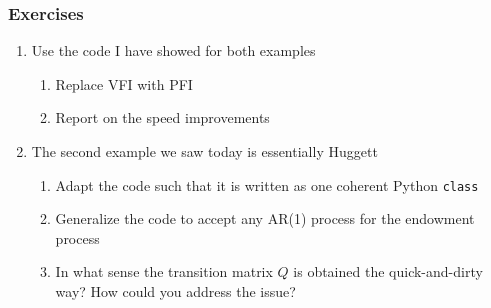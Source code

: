 \documentclass[10pt, aspectratio=1610, natbib, handout]{beamer}
\begin{document}
  \begin{frame}
    \frametitle{Exercises}

    \begin{enumerate}
      \item Use the code I have showed for both examples
        \begin{enumerate}
          \item Replace VFI with PFI
          \item Report on the speed improvements
        \end{enumerate}
      \vfill
      \item The second example we saw today is essentially Huggett
        \begin{enumerate}
          \item Adapt the code such that it is written as one coherent Python \texttt{class}
          \item Generalize the code to accept any AR(1) process for the endowment process
          \item In what sense the transition matrix $Q$ is obtained the quick-and-dirty way? How could you address the issue?
        \end{enumerate}
    \end{enumerate}

  \end{frame}
\end{document}
